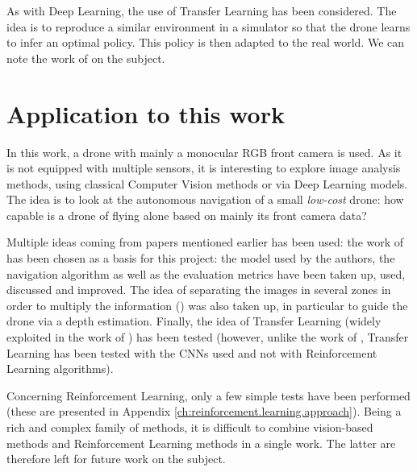As with Deep Learning, the use of Transfer Learning has been considered. The idea is to reproduce a similar environment in a simulator so that the drone learns to infer an optimal policy. This policy is then adapted to the real world. We can note the work of \textcite{anwar2020autonomous} on the subject.

\section{Application to this work}

In this work, a drone with mainly a monocular RGB front camera is used. As it is not equipped with multiple sensors, it is interesting to explore image analysis methods, using classical Computer Vision methods or via Deep Learning models. The idea is to look at the autonomous navigation of a small \emph{low-cost} drone: how capable is a drone of flying alone based on mainly its front camera data?

Multiple ideas coming from papers mentioned earlier has been used: the work of \textcite{padhy2018deep} has been chosen as a basis for this project: the model used by the authors, the navigation algorithm as well as the evaluation metrics have been taken up, used, discussed and improved. The idea of separating the images in several zones in order to multiply the information (\textcite{kouris2018learning}) was also taken up, in particular to guide the drone via a depth estimation. Finally, the idea of Transfer Learning (widely exploited in the work of \textcite{anwar2020autonomous}) has been tested (however, unlike the work of \textcite{anwar2020autonomous}, Transfer Learning has been tested with the CNNs used and not with Reinforcement Learning algorithms).

Concerning Reinforcement Learning, only a few simple tests have been performed (these are presented in Appendix \ref{ch:reinforcement.learning.approach}). Being a rich and complex family of methods, it is difficult to combine vision-based methods and Reinforcement Learning methods in a single work. The latter are therefore left for future work on the subject.
